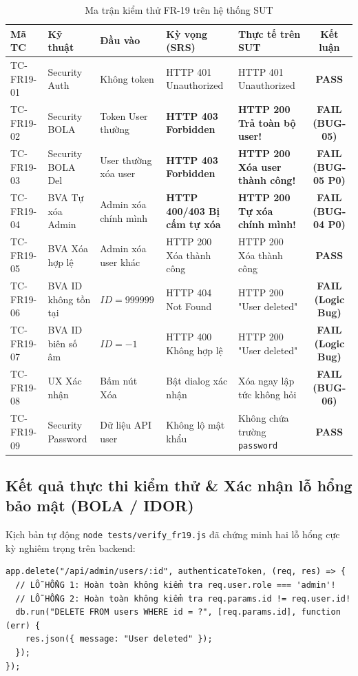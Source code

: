 \documentclass[11pt,a4paper]{article}
\begin{document}
\begin{table}[h]
\centering
\footnotesize
\begin{tabularx}{\textwidth}{l L{2.2cm} L{1.8cm} L{3cm} Y c}
\toprule
\textbf{Mã TC} & \textbf{Kỹ thuật} & \textbf{Đầu vào} & \textbf{Kỳ vọng (SRS)} & \textbf{Thực tế trên SUT} & \textbf{Kết luận} \\
\midrule
TC-FR19-01 & Security Auth & Không token & HTTP 401 Unauthorized & HTTP 401 Unauthorized & \textbf{PASS} \\
TC-FR19-02 & Security BOLA & Token User thường & \textbf{HTTP 403 Forbidden} & \textbf{HTTP 200 Trả toàn bộ user!} & \textbf{\color{darkred}FAIL (BUG-05)} \\
TC-FR19-03 & Security BOLA Del & User thường xóa user & \textbf{HTTP 403 Forbidden} & \textbf{HTTP 200 Xóa user thành công!} & \textbf{\color{darkred}FAIL (BUG-05 P0)} \\
TC-FR19-04 & BVA Tự xóa Admin & Admin xóa chính mình & \textbf{HTTP 400/403 Bị cấm tự xóa} & \textbf{HTTP 200 Tự xóa chính mình!} & \textbf{\color{darkred}FAIL (BUG-04 P0)} \\
TC-FR19-05 & BVA Xóa hợp lệ & Admin xóa user khác & HTTP 200 Xóa thành công & HTTP 200 Xóa thành công & \textbf{PASS} \\
TC-FR19-06 & BVA ID không tồn tại & $ID = 999999$ & HTTP 404 Not Found & HTTP 200 "User deleted" & \textbf{\color{darkred}FAIL (Logic Bug)} \\
TC-FR19-07 & BVA ID biên số âm & $ID = -1$ & HTTP 400 Không hợp lệ & HTTP 200 "User deleted" & \textbf{\color{darkred}FAIL (Logic Bug)} \\
TC-FR19-08 & UX Xác nhận & Bấm nút Xóa & Bật dialog xác nhận & Xóa ngay lập tức không hỏi & \textbf{\color{darkred}FAIL (BUG-06)} \\
TC-FR19-09 & Security Password & Dữ liệu API user & Không lộ mật khẩu & Không chứa trường \texttt{password} & \textbf{PASS} \\
\bottomrule
\end{tabularx}
\caption{Ma trận kiểm thử FR-19 trên hệ thống SUT}
\end{table}

\subsection{Kết quả thực thi kiểm thử \& Xác nhận lỗ hổng bảo mật (BOLA / IDOR)}
Kịch bản tự động \texttt{node tests/verify\_fr19.js} đã chứng minh hai lỗ hổng cực kỳ nghiêm trọng trên backend:
\begin{lstlisting}[caption={Lỗ hổng BOLA và vi phạm ràng buộc tự xóa trong server.js:504-508}]
app.delete("/api/admin/users/:id", authenticateToken, (req, res) => {
  // LỖ HỔNG 1: Hoàn toàn không kiểm tra req.user.role === 'admin'!
  // LỖ HỔNG 2: Hoàn toàn không kiểm tra req.params.id != req.user.id!
  db.run("DELETE FROM users WHERE id = ?", [req.params.id], function (err) {
    res.json({ message: "User deleted" });
  });
});
\end{lstlisting}
\end{document}
